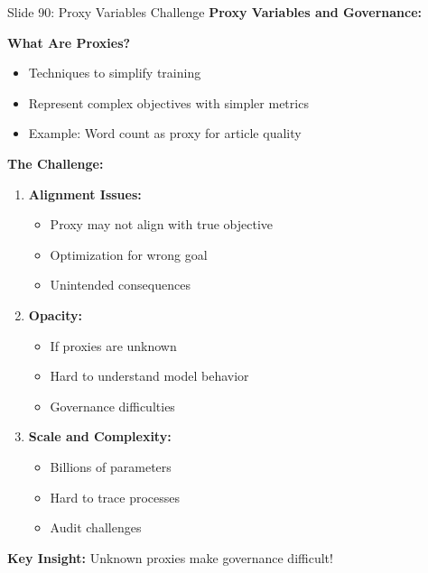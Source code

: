 \documentclass[8pt]{beamer}
\begin{document}
	\begin{frame}{Slide 90: Proxy Variables Challenge}
		\fontsize{6.5}{7.5}\selectfont
		\textbf{Proxy Variables and Governance:}
		
		\vspace{0.1cm}
		\textbf{What Are Proxies?}
		\begin{itemize}
			\item Techniques to simplify training
			\item Represent complex objectives with simpler metrics
			\item Example: Word count as proxy for article quality
		\end{itemize}
		
		\vspace{0.1cm}
		\textbf{The Challenge:}
		\begin{enumerate}
			\item \textbf{Alignment Issues:}
			\begin{itemize}
				\item Proxy may not align with true objective
				\item Optimization for wrong goal
				\item Unintended consequences
			\end{itemize}
			\item \textbf{Opacity:}
			\begin{itemize}
				\item If proxies are unknown
				\item Hard to understand model behavior
				\item Governance difficulties
			\end{itemize}
			\item \textbf{Scale and Complexity:}
			\begin{itemize}
				\item Billions of parameters
				\item Hard to trace processes
				\item Audit challenges
			\end{itemize}
		\end{enumerate}
		
		\textcolor{myblue}{\textbf{Key Insight:}} Unknown proxies \textcolor{myblue}{make governance difficult}!
	\end{frame}
	
\end{document}
